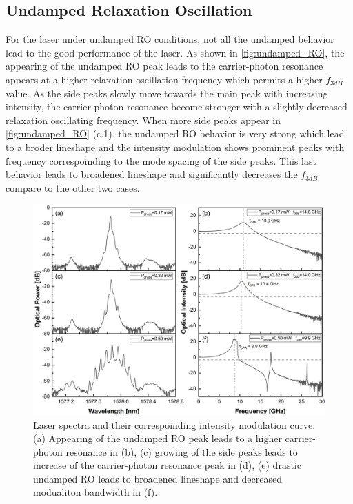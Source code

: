 \subsection{Undamped Relaxation Oscillation}\label{subsec:undamped_RO_measurement}
For the laser under undamped RO conditions, not all the undamped behavior lead to the good performance of the laser. As shown in \autoref{fig:undamped_RO}, the appearing of the undamped RO peak leads to the carrier-photon resonance appears at a higher relaxation oscillation frequency which permits a higher $f_{3dB}$ value. As the side peaks slowly move towards the main peak with increasing intensity, the carrier-photon resonance become stronger with a slightly decreased relaxation oscillating frequency. When more side peaks appear in \autoref{fig:undamped_RO} (c.1), the undamped RO behavior is very strong which lead to a broder lineshape and the intensity modulation shows prominent peaks with frequency correspoinding to the mode spacing of the side peaks. This last behavior leads to broadened lineshape and significantly decreases the $f_{3dB}$ compare to the other two cases.

\begin{figure}[ht]
    \centering
    \includegraphics[width=\linewidth]{figures/Umdamped_RO_and_bandwidth_grating_4621.png}
    \caption{Laser spectra and their correspoinding intensity modulation curve. (a) Appearing of the undamped RO peak leads to a higher carrier-photon resonance in (b), (c) growing of the side peaks leads to increase of the carrier-photon resonance peak in (d), (e) drastic undamped RO leads to broadened lineshape and decreased modualiton bandwidth in (f).}
    \label{fig:undamped_RO}
\end{figure}

